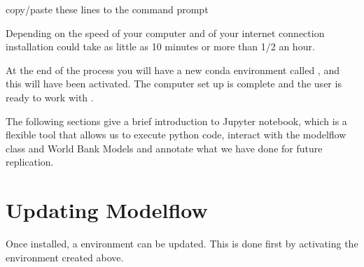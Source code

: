 \documentclass[letterpaper,10pt,english]{jupyterBook}
\begin{document}
\sphinxAtStartPar
copy/paste these lines to the command prompt

\begin{sphinxVerbatim}[commandchars=\\\{\}]
\PYGZbs{}\PYGZbs{}\PYGZbs{} \PYGZbs{} 

          

  
  
    
   
   
   
   


\end{sphinxVerbatim}

\sphinxAtStartPar
Depending on the speed of your computer and of your internet connection installation could take as little as 10 minutes or more than 1/2 an hour.

\sphinxAtStartPar
At the end of the process you will have a new conda environment called , and this will have been activated. The computer set up is complete and the user is ready to work with .

\sphinxAtStartPar
The following sections give a brief introduction to Jupyter notebook, which is a flexible tool that allows us to execute python code, interact with the modelflow class and World Bank Models and annotate what we have done for future replication.


\section{Updating Modelflow}
\label{\detokenize{content/03_Installation/Installing:updating-modelflow}}
\sphinxAtStartPar
Once installed, a  environment can be updated. This is done first by activating the  environment created above.
\end{document}
